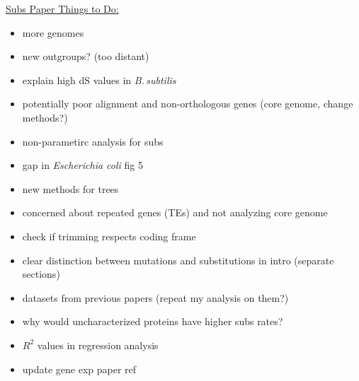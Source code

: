 \documentclass[12pt]{article}
\newcommand{\strep}{\textit{Streptomyces}\xspace}
\newcommand{\bass}{\textit{B.\,subtilis}\xspace}
\newcommand{\ecol}{\textit{E.\,coli}\xspace}
\newcommand{\ecoli}{\textit{Escherichia coli}\xspace}
\newcommand{\pb}{pSymB\xspace}
\begin{document}
\underline{Subs Paper Things to Do:}
\begin{itemize}
	\item  more genomes
	\item new  outgroups? (too distant)
	\item explain high dS values in \bass
	\item potentially poor alignment and non-orthologous genes (core genome, change methods?)
	\item non-parametirc analysis for subs
	\item gap in \ecoli fig 5
	\item new methods for trees
	\item concerned about repeated genes (TEs) and not analyzing core genome
	\item check if trimming respects coding frame
	\item clear distinction between mutations and substitutions in intro (separate sections)
	\item datasets from previous papers (repeat my analysis on them?)
	\item why would uncharacterized proteins have higher subs rates?
	\item $R^2$ values in regression analysis
	\item update gene exp paper ref
	
%	
%	
%	
%	
%	
%	
%	
%	
%	
%	
%
%	
%	
%	
%	 
	

\end{itemize}
\end{document}
